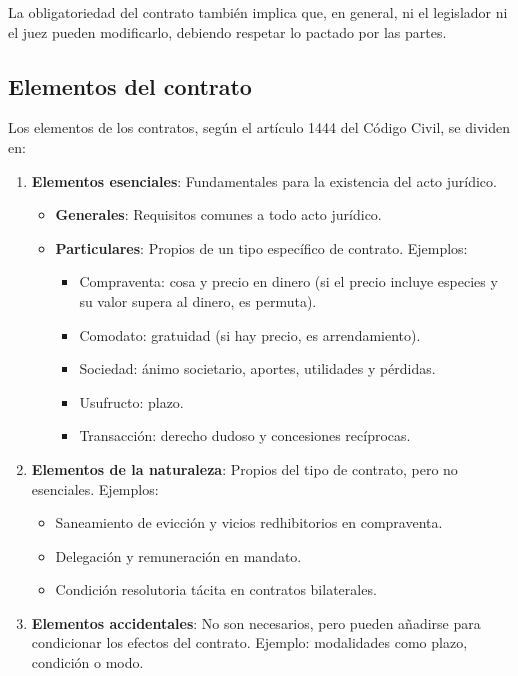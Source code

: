 \documentclass{templateNote}
\begin{document}
La obligatoriedad del contrato también implica que, en general, ni el legislador ni el juez pueden modificarlo, debiendo respetar lo pactado por las partes.

\subsection{Elementos del contrato}
Los elementos de los contratos, según el artículo 1444 del Código Civil, se dividen en:

\begin{enumerate}
    \item \textbf{Elementos esenciales}: Fundamentales para la existencia del acto jurídico.
    \begin{itemize}
        \item \textbf{Generales}: Requisitos comunes a todo acto jurídico.
        \item \textbf{Particulares}: Propios de un tipo específico de contrato. Ejemplos:
        \begin{itemize}
            \item Compraventa: cosa y precio en dinero (si el precio incluye especies y su valor supera al dinero, es permuta).
            \item Comodato: gratuidad (si hay precio, es arrendamiento).
            \item Sociedad: ánimo societario, aportes, utilidades y pérdidas.
            \item Usufructo: plazo.
            \item Transacción: derecho dudoso y concesiones recíprocas.
        \end{itemize}
    \end{itemize}
    \item \textbf{Elementos de la naturaleza}: Propios del tipo de contrato, pero no esenciales. Ejemplos:
    \begin{itemize}
        \item Saneamiento de evicción y vicios redhibitorios en compraventa.
        \item Delegación y remuneración en mandato.
        \item Condición resolutoria tácita en contratos bilaterales.
    \end{itemize}
    \item \textbf{Elementos accidentales}: No son necesarios, pero pueden añadirse para condicionar los efectos del contrato. Ejemplo: modalidades como plazo, condición o modo.
\end{enumerate}
\end{document}
